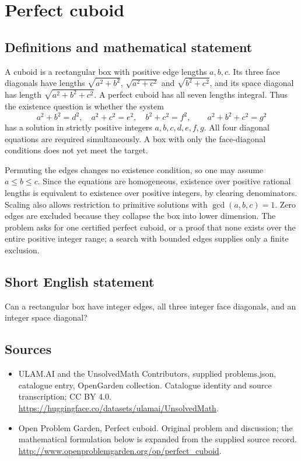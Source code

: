 \documentclass[11pt,a4paper]{article}
\begin{document}
\section*{Perfect cuboid}\label{statement}

\subsection{Definitions and mathematical statement}
A cuboid is a rectangular box with positive edge lengths $a,b,c$.
Its three face diagonals have lengths
$\sqrt{a^2+b^2}$, $\sqrt{a^2+c^2}$ and $\sqrt{b^2+c^2}$, and
its space diagonal has length $\sqrt{a^2+b^2+c^2}$. A perfect cuboid
has all seven lengths integral. Thus the existence question is
whether the system
\[
 a^2+b^2=d^2,\quad a^2+c^2=e^2,\quad b^2+c^2=f^2,
 \qquad a^2+b^2+c^2=g^2
\]
has a solution in strictly positive integers $a,b,c,d,e,f,g$.
All four diagonal equations are required simultaneously. A box
with only the face-diagonal conditions does not yet meet the target.

Permuting the edges changes no existence condition, so one may
assume $a\le b\le c$. Since the equations are homogeneous,
existence over positive rational lengths is equivalent to existence
over positive integers, by clearing denominators. Scaling also
allows restriction to primitive solutions with $\gcd(a,b,c)=1$.
Zero edges are excluded because they collapse the box into lower
dimension. The problem asks for one certified perfect cuboid, or
a proof that none exists over the entire positive integer range;
a search with bounded edges supplies only a finite exclusion.
\subsection{Short English statement}
Can a rectangular box have integer edges, all three integer face diagonals, and an integer space diagonal?
\subsection{Sources}
\begin{itemize}
\item[S1] ULAM.AI and the UnsolvedMath Contributors, supplied problems.json, catalogue entry, OpenGarden collection. Catalogue identity and source transcription; CC BY 4.0.
\url{https://huggingface.co/datasets/ulamai/UnsolvedMath}.
\item[S2] Open Problem Garden, Perfect cuboid. Original problem and discussion; the mathematical formulation below is expanded from the supplied source record.
\url{http://www.openproblemgarden.org/op/perfect_cuboid}.
\end{itemize}
\end{document}
